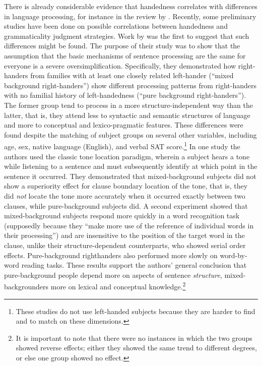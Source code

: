There is already considerable evidence that handedness correlates with differences in language processing, for instance in the review by \citet{HardyckEtAl1979}. Recently, some preliminary studies have been done on possible correlations between handedness and grammaticality judgment strategies. Work by \citet{BeverEtAl1987} was the first to suggest that such differences might be found. The purpose of their study was to show that the assumption that the basic mechanisms of sentence processing are the same for everyone is a severe oversimplification. Specifically, they demonstrated how right-handers from families with at least one closely related left-hander (``mixed background right-handers'') show different processing patterns from right-handers with no familial history of left-handedness (``pure background right-handers''). The former group tend to process in a more structure-independent way than the latter, that is, they attend less to syntactic and semantic structures of language and more to conceptual and lexico-pragmatic features. These differences were found despite the matching of subject groups on several other variables, including age, sex, native language (English), and verbal SAT score.\footnote{These studies do not use left-handed subjects because they are harder to find and to match on these dimensions.}
 In one study the authors used the classic tone location paradigm, wherein a subject hears a tone while listening to a sentence and must subsequently identify at which point in the sentence it occurred. They demonstrated that mixed-background subjects did not show a superiority effect for clause boundary location of the tone, that is, they did \textit{not} locate the tone more accurately when it occurred exactly between two clauses, while pure-background subjects did. A second experiment showed that mixed-background subjects respond more quickly in a word recognition task (supposedly because they ``make more use of the reference of individual words in their processing'') and are insensitive to the position of the target word in the clause, unlike their structure-dependent counterparts, who showed serial order effects. Pure-background righthanders also performed more slowly on word-by-word reading tasks. These results support the authors' general conclusion that pure-background people depend
more on aspects of sentence \textit{structure}, mixed-backgrounders more on lexical and conceptual knowledge.\footnote{It is important to note that there were no instances in which the two groups showed reverse effects; either they showed the same trend to different degrees, or else one group showed no effect.}
